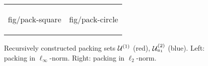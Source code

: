 \begin{figure}[t]
	\begin{center}
		\begin{tabular}{cc}
			\begin{overpic}[width=.35\columnwidth]{%
					fig/pack-square}
			\end{overpic} &
			\begin{overpic}[width=.35\columnwidth]{%
					fig/pack-circle}
			\end{overpic}
		\end{tabular}
		\caption{\label{fig:pack-set} Recursively
			constructed packing sets $\Uone$ (red), $\Utemp{1}{2}$ (blue). Left: packing in $\ell_\infty$-norm. Right:
			packing in $\ell_2$-norm.}
	\end{center}
\end{figure}

